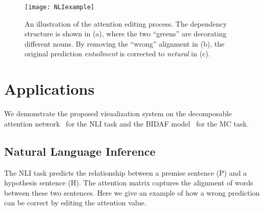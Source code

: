 \begin{figure*}[t]
\centering
\vspace{-2mm}
 \texttt{[image: NLIexample]}
  \vspace{-7mm}
 \caption{
An illustration of the attention editing process.
The dependency structure is shown in (a), where the two ``greens'' are decorating different nouns.
By removing the ``wrong'' alignment in (b), the original prediction \emph{entailment} is corrected to \emph{netural} in (c).
}
\vspace{-2mm}
\label{fig:NLIexample}
\end{figure*}

\section{Applications}
We demonstrate the proposed visualization system on the decomposable attention network~\cite{parikh2016emnlp}
for the NLI task and the BIDAF model~\cite{Seo2016} for the MC task.

\subsection{Natural Language Inference}
\label{sec:NLIexample}
The NLI task predicts the relationship between a premise sentence (P) and a hypothesis sentence (H).
The attention matrix captures the alignment of words between these two sentences.
Here we give an example of how a wrong prediction can be correct by editing the attention value.  


